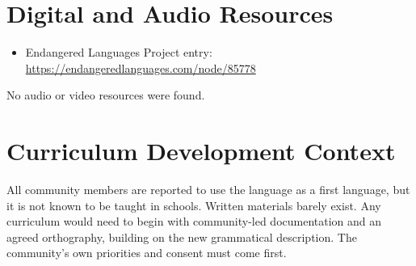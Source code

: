 \documentclass[12pt]{article}
\begin{document}
\section{Digital and Audio Resources}
\begin{itemize}
\item Endangered Languages Project entry: \url{https://endangeredlanguages.com/node/85778}
\end{itemize}
No audio or video resources were found.

\section{Curriculum Development Context}
All community members are reported to use the language as a first language, but it is not known to be taught in schools. Written materials barely exist. Any curriculum would need to begin with community-led documentation and an agreed orthography, building on the new grammatical description. The community's own priorities and consent must come first.
\end{document}
